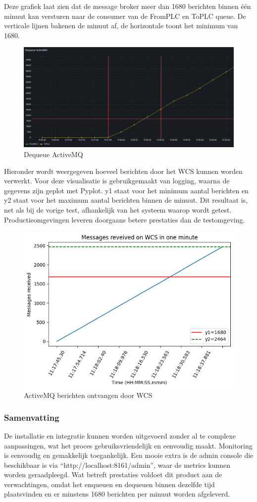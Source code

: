 Deze grafiek laat zien dat de message broker meer dan 1680 berichten binnen één minuut kan versturen naar de consumer van de FromPLC en ToPLC queue.
De verticale lijnen bakenen de minuut af, de horizontale toont het minimum van 1680.
\begin{figure}[h!]
  \centering
  \includegraphics[width=.80\textwidth]{img/amq-dequeue-count.png}
  \caption{\label{fig:amq_dequeue_count}Dequeue ActiveMQ}
\end{figure}
\newpage

Hieronder wordt weergegeven hoeveel berichten door het WCS kunnen worden verwerkt.
Voor deze visualisatie is gebruikgemaakt van logging, waarna de gegevens zijn geplot met Pyplot.
y1 staat voor het minimum aantal berichten en y2 staat voor het maximum aantal berichten binnen de minuut.
Dit resultaat is, net als bij de vorige test, afhankelijk van het systeem waarop wordt getest. 
Productieomgevingen leveren doorgaans betere prestaties dan de testomgeving.
\begin{figure}[h!]
  \centering
  \includegraphics[width=.80\textwidth]{img/amq_received_wcs.png}
  \caption{\label{fig:amq_received_wcs}ActiveMQ berichten ontvangen door WCS}
\end{figure}

\subsubsection{Samenvatting}
De installatie en integratie kunnen worden uitgevoerd zonder al te complexe aanpassingen, 
wat het proces gebruiksvriendelijk en eenvoudig maakt.
Monitoring is eenvoudig en gemakkelijk toegankelijk. 
Een mooie extra is de admin console die beschikbaar is via ``http://localhost:8161/admin'', waar de metrics kunnen worden geraadpleegd.
Wat betreft prestaties voldoet dit product aan de verwachtingen, 
omdat het enqueuen en dequeuen binnen dezelfde tijd plaatsvinden en er minstens 1680 berichten per minuut worden afgeleverd.

